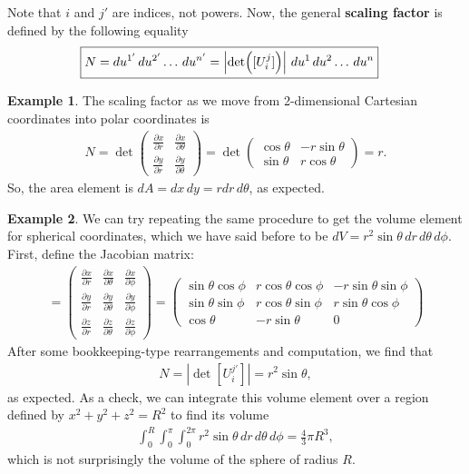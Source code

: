 \documentclass{book}
\theoremstyle{definition}
\newtheorem{exmp}{Example}[section]
\begin{document}
Note that $i$ and $j'$ are indices, not powers. Now, the general \textbf{scaling factor} is defined by the following equality
\begin{align*}
\Aboxed{N = du^{1'}\,du^{2'}\dots\,du^{n'} = \left| \det([U^{j}_{i}])\right| \,du^1\,du^2\dots\,du^{n}}
\end{align*}
\begin{exmp}
The scaling factor as we move from 2-dimensional Cartesian coordinates into polar coordinates is
\begin{align*}
N = \det\begin{pmatrix}
\frac{\partial x}{\partial r} & \frac{\partial x}{\partial \theta}\\
\frac{\partial y}{\partial r} & \frac{\partial y}{\partial \theta}
\end{pmatrix}
=
\det\begin{pmatrix}
\cos\theta & -r\sin\theta\\
\sin\theta & r\cos\theta
\end{pmatrix}
=
r.
\end{align*}
So, the area element is $dA = dx\,dy = rdr\,d\theta$, as expected. 
\end{exmp}
\begin{exmp}
We can try repeating the same procedure to get the volume element for spherical coordinates, which we have said before to be $dV = r^2\sin\theta\,dr\,d\theta\,d\phi$. First, define the Jacobian matrix:
\begin{align*}
[U^{j'}_{i}] = \begin{pmatrix}
\frac{\partial x}{\partial r} & \frac{\partial x}{\partial \theta} & \frac{\partial x}{\partial \phi}\\
\frac{\partial y}{\partial r} & \frac{\partial y}{\partial \theta} & \frac{\partial y}{\partial \phi}\\
\frac{\partial z}{\partial r} & \frac{\partial z}{\partial \theta} & \frac{\partial z}{\partial \phi}
\end{pmatrix}
=
\begin{pmatrix}
\sin\theta\cos\phi & r\cos\theta\cos\phi & -r\sin\theta\sin\phi \\
\sin\theta\sin\phi & r\cos\theta\sin\phi & r\sin\theta\cos\phi \\
\cos\theta & -r\sin\theta & 0
\end{pmatrix}
\end{align*}
After some bookkeeping-type rearrangements and computation, we find that
\begin{align*}
N = \left|\det[U^{j'}_{i}]\right|= r^2\sin\theta,
\end{align*}
as expected. As a check, we can integrate this volume element over a region defined by $x^2+y^2+z^2 = R^2$ to find its volume
\begin{align*}
\int_{0}^{R}\int_{0}^{\pi}\int_{0}^{2\pi}r^2\sin\theta\,dr\,d\theta\,d\phi = \frac{4}{3}\pi R^3,
\end{align*}
which is not surprisingly the volume of the sphere of radius $R$. 
\end{exmp}
\newpage
\end{document}
